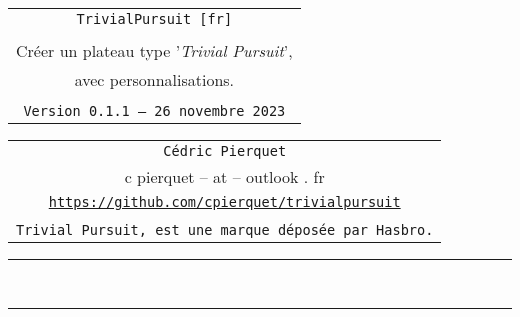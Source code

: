 \documentclass[11pt,a4paper]{ltxdoc}
\def\TPversion{0.1.1}
\def\TPdate{26 novembre 2023}
\begin{document}
\pagestyle{fancy}

\thispagestyle{empty}

\begin{center}
	\begin{minipage}{0.88\linewidth}
	\begin{tcolorbox}[colframe=yellow,colback=yellow!15]
		\begin{center}
			\begin{tabular}{c}
				{\Huge \texttt{TrivialPursuit [fr]}}\\
				\\
				{\LARGE Créer un plateau type '\textit{Trivial Pursuit}',} \\
				{\LARGE avec personnalisations.} \\
				\\
				{\small \texttt{Version \TPversion{} -- \TPdate}}
		\end{tabular}
		\end{center}
	\end{tcolorbox}
\end{minipage}
\end{center}

\begin{center}
	\begin{tabular}{c}
	\texttt{Cédric Pierquet}\\
	{\ttfamily c pierquet -- at -- outlook . fr}\\
	\texttt{\url{https://github.com/cpierquet/trivialpursuit}} \\
	\\
	\texttt{Trivial Pursuit\texttrademark, est une marque déposée par Hasbro.}
\end{tabular}
\end{center}

\hrule

\vfill

\begin{tcolorbox}[colframe=lightgray,colback=lightgray!5]
\PlateauTrivialPursuit
\end{tcolorbox}

\vfill~

\pagebreak


\hypertarget{matoc}{}

\tableofcontents

\vspace*{5mm}

\hrule

\vspace*{5mm}
\end{document}
